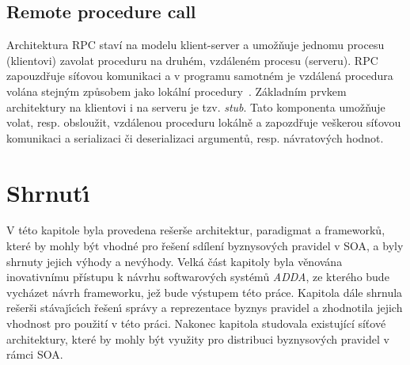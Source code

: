 \subsection{Remote procedure call}\label{sec:rpc}

Architektura \gls{RPC} staví na modelu klient-server a umožňuje jednomu procesu (klientovi)
zavolat proceduru na druhém, vzdáleném procesu (serveru).
\gls{RPC} zapouzdřuje síťovou komunikaci a v programu samotném
je vzdálená procedura volána stejným způsobem jako lokální procedury~\cite{nelson1981remote}. Základním
prvkem architektury na klientovi i na serveru je tzv. \textit{stub}. Tato komponenta
umožňuje volat, resp. obsloužit, vzdálenou proceduru lokálně a zapozdřuje veškerou
síťovou komunikaci a serializaci či deserializaci argumentů, resp. návratových hodnot.

\section{Shrnut\'{\i}}

V této kapitole byla provedena rešerše architektur, paradigmat a frameworků, které by mohly být vhodné
pro řešení sdílení byznysových pravidel v \gls{SOA}, a byly shrnuty jejich v\'yhody a nev\'yhody.
Velká část kapitoly byla věnována inovativnímu přístupu k návrhu softwarov\'ych systémů \textit{ADDA},
ze kterého bude vycházet návrh frameworku, jež bude výstupem této práce.
Kapitola dále shrnula rešerši stávaj\'{\i}c\'{\i}ch řešen\'{\i} správy a reprezentace byznys pravidel
a zhodnotila jejich vhodnost pro použití v této práci. Nakonec kapitola studovala existující
síťové architektury, které by mohly být využity pro distribuci byznysových pravidel v rámci \gls{SOA}.
